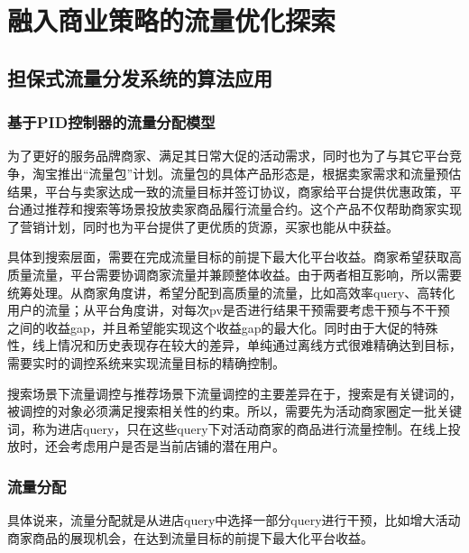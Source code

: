 
\chapter{ 融入商业策略的流量优化探索 }
\thispagestyle{empty}

\setlength{\fboxrule}{0pt}\setlength{\fboxsep}{0cm}
\noindent\shadowbox{
\begin{tcolorbox}[arc=0mm,colback=lightblue,colframe=darkblue,title=学习目标与要求]

\end{tcolorbox}}
\setlength{\fboxrule}{1pt}\setlength{\fboxsep}{4pt} 

\section{担保式流量分发系统的算法应用}
\subsection {基于PID控制器的流量分配模型}
为了更好的服务品牌商家、满足其日常大促的活动需求，同时也为了与其它平台竞争，淘宝推出“流量包”计划。流量包的具体产品形态是，根据卖家需求和流量预估结果，平台与卖家达成一致的流量目标并签订协议，商家给平台提供优惠政策，平台通过推荐和搜索等场景投放卖家商品履行流量合约。这个产品不仅帮助商家实现了营销计划，同时也为平台提供了更优质的货源，买家也能从中获益。

具体到搜索层面，需要在完成流量目标的前提下最大化平台收益。商家希望获取高质量流量，平台需要协调商家流量并兼顾整体收益。由于两者相互影响，所以需要统筹处理。从商家角度讲，希望分配到高质量的流量，比如高效率query、高转化用户的流量；从平台角度讲，对每次pv是否进行结果干预需要考虑干预与不干预之间的收益gap，并且希望能实现这个收益gap的最大化。同时由于大促的特殊性，线上情况和历史表现存在较大的差异，单纯通过离线方式很难精确达到目标，需要实时的调控系统来实现流量目标的精确控制。

搜索场景下流量调控与推荐场景下流量调控的主要差异在于，搜索是有关键词的，被调控的对象必须满足搜索相关性的约束。所以，需要先为活动商家圈定一批关键词，称为进店query，只在这些query下对活动商家的商品进行流量控制。在线上投放时，还会考虑用户是否是当前店铺的潜在用户。

\subsection{流量分配}
具体说来，流量分配就是从进店query中选择一部分query进行干预，比如增大活动商家商品的展现机会，在达到流量目标的前提下最大化平台收益。
